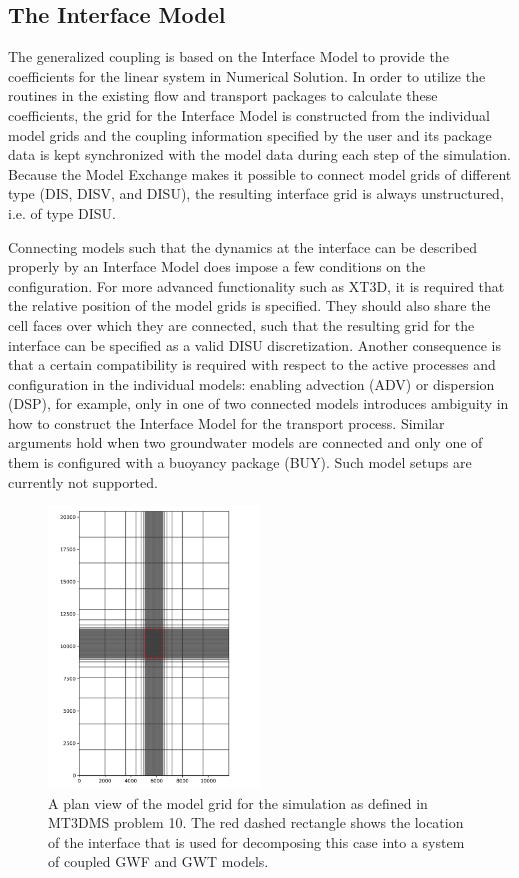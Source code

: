 \subsection{The Interface Model}
The generalized coupling is based on the Interface Model to provide the coefficients for the linear system in Numerical Solution. In order to utilize the routines in the existing flow and transport packages to calculate these coefficients, the grid for the Interface Model is constructed from the individual model grids and the coupling information specified by the user and its package data is kept synchronized with the model data during each step of the simulation. Because the Model Exchange makes it possible to connect model grids of different type (DIS, DISV, and DISU), the resulting interface grid is always unstructured, i.e. of type DISU.

Connecting models such that the dynamics at the interface can be described properly by an Interface Model does impose a few conditions on the configuration. For more advanced functionality such as XT3D, it is required that the relative position of the model grids is specified. They should also share the cell faces over which they are connected, such that the resulting grid for the interface can be specified as a valid DISU discretization. Another consequence is that a certain compatibility is required with respect to the active processes and configuration in the individual models: enabling advection (ADV) or dispersion (DSP), for example, only in one of two connected models introduces ambiguity in how to construct the Interface Model for the transport process. Similar arguments hold when two groundwater models are connected and only one of them is configured with a buoyancy package (BUY). Such model setups are currently not supported.

\begin{figure}[!t]
	\begin{center}
	\includegraphics[width=0.5\textwidth]{./Figures/InterfaceModel/mt3dms-p10-modelgrid.png}
	\caption[A plan view of the model grid from MT3DMS problem 10]{A plan view of the model grid for the simulation as defined in MT3DMS problem 10. The red dashed rectangle shows the location of the interface that is used for decomposing this case into a system of coupled GWF and GWT models.}
	\label{fig:gwtgwt-fullgrid}
	\end{center}
\end{figure}

